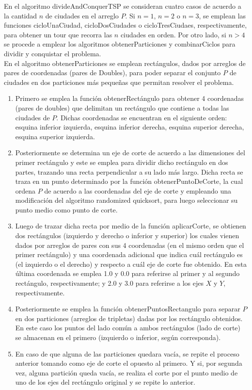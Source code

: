 \documentclass[titlepage]{article}
\begin{document}
	En el algoritmo divideAndConquerTSP se consideran cuatro casos de acuerdo a la cantidad $n$ de ciudades en el arreglo $P$. Si $n = 1$, $n = 2$ o $n = 3$, se emplean las funciones cicloUnaCiudad, cicloDosCiudades o cicloTresCiudaes, respectivamente, para obtener un tour que recorra las $n$ ciudades en orden. Por otro lado, si $n > 4$ se procede a emplear los algoritmos obtenerParticiones y combinarCiclos para dividir y conquistar el problema.\\
	
	En el algoritmo obtenerParticiones se emplean rect\'angulos, dados por arreglos de pares de coordenadas (pares de Doubles), para poder separar el conjunto $P$ de ciudades en dos particiones m\'as pequeñas que permitan resolver el problema.
	\begin{enumerate}
		\item Primero se emplea la funci\'on obtenerRect\'angulo para obtener 4 coordenadas (pares de doubles) que delimitan un rect\'angulo que contiene a todas las ciudades de $P$. Dichas coordenadas se encuentran en el siguiente orden: esquina inferior izquierda, esquina inferior derecha, esquina superior derecha, esquina superior izquierda.
		\item  Posteriormente se determina un eje de corte de acuerdo a las dimensiones del primer rect\'angulo y este se emplea para dividir dicho rect\'angulo en dos partes, trazando una recta perpendicular a su lado m\'as largo. Dicha recta se traza en un punto determinado por la funci\'on obtenerPuntoDeCorte, la cual ordena $P$ de acuerdo a las coordenadas del eje de corte y empleando una modificaci\'on del algoritmo randomized quicksort, para luego seleccionar su punto medio como punto de corte.
		\item Luego de trazar dicha recta por medio de la funci\'on aplicarCorte, se obtienen dos rect\'angulos (izquierdo y derecho o inferior y superior) los cuales vienen dados por arreglos de pares con sus 4 coordenadas (en el mismo orden que el primer rect\'angulo) y una coordenada adicional que indica cu\'al rect\'angulo es (el izquierdo o el derecho) y respecto a cu\'al eje de corte fue obtenido. En esta \'ultima coordenada se emplea 1.0 y 0.0 para referirse al primer y al segundo rect\'angulo, respectivamente; y 2.0 y 3.0 para referirse a los ejes $X$ y $Y$, respectivamente. 
		\item Posteriormente se emplea la funci\'on obtenerPuntosRectangulo para separar $P$ en dos particiones (arreglos de tripletas) dadas por los rect\'angulo obtenidos. En este caso los puntos del lado com\'un a ambos rect\'angulos (lado de corte) se almacenan en el primero (izquierdo o inferior, seg\'un corresponda).
		\item En caso de que alguna de las particiones quedara vac\'ia, se repite el proceso anterior tomando como eje de corte el opuesto al primero. Y si, por segunda vez, alguna partici\'on queda vac\'ia, se realiza el corte por el punto medio de uno de los ejes del rect\'angulo original y se repite lo anterior. 
	\end{enumerate}
	
\end{document}
